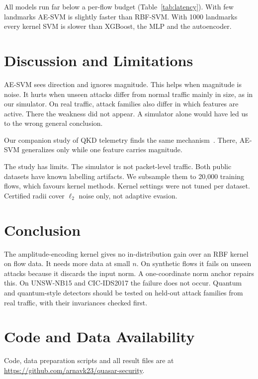 \documentclass[conference,10pt]{IEEEtran}
\begin{document}
All models run far below a per-flow budget (Table~\ref{tab:latency}). With few
landmarks AE-SVM is slightly faster than RBF-SVM. With 1000 landmarks every kernel
SVM is slower than XGBoost, the MLP and the autoencoder.

\section{Discussion and Limitations}

AE-SVM sees direction and ignores magnitude. This helps when magnitude is noise.
It hurts when unseen attacks differ from normal traffic mainly in size, as in our
simulator. On real traffic, attack families also differ in which features are
active. There the weakness did not appear. A simulator alone would have led us to
the wrong general conclusion.

Our companion study of QKD telemetry finds the same mechanism~\cite{kapoor2026hyqad}.
There, AE-SVM generalizes only while one feature carries magnitude.

The study has limits. The simulator is not packet-level traffic. Both public
datasets have known labelling artifacts. We subsample them to 20,000 training
flows, which favours kernel methods. Kernel settings were not tuned per dataset.
Certified radii cover $\ell_2$ noise only, not adaptive evasion.

\section{Conclusion}

The amplitude-encoding kernel gives no in-distribution gain over an RBF kernel on
flow data. It needs more data at small $n$. On synthetic flows it fails on unseen
attacks because it discards the input norm. A one-coordinate norm anchor repairs
this. On UNSW-NB15 and CIC-IDS2017 the failure does not occur. Quantum and
quantum-style detectors should be tested on held-out attack families from real
traffic, with their invariances checked first.

\section*{Code and Data Availability}
Code, data preparation scripts and all result files are at
\url{https://github.com/arnavk23/quasar-security}.



\end{document}
